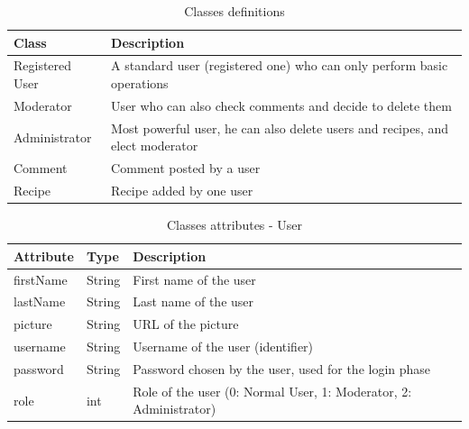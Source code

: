 \documentclass[a4paper]{report}
\begin{document}
\begin{table}[htpb]
\caption{Classes definitions}
\centering 
\begin{tabular}{|l|l|}
\hline
\rowcolor[HTML]{000000} 
{\color[HTML]{FFFFFF} Class} & {\color[HTML]{FFFFFF} Description}                                            \\ \hline
Registered User              & A standard user (registered one) who can only perform basic operations        \\ \hline
Moderator                    & User who can also check comments and decide to delete them                    \\ \hline
Administrator                & Most powerful user, he can also delete users and recipes, and elect moderator \\ \hline
Comment                      & Comment posted by a user                                                      \\ \hline
Recipe                       & Recipe added by one user                                                      \\ \hline
\end{tabular}
\end{table}

\begin{table}[htpb]
\caption{Classes attributes - User}
\centering 
\begin{tabular}{|l|l|l|}
\hline
\rowcolor[HTML]{000000} 
{\color[HTML]{FFFFFF} Attribute} & {\color[HTML]{FFFFFF} Type} & {\color[HTML]{FFFFFF} Description}                                \\ \hline
firstName                        & String                      & First name of the user                                            \\ \hline
lastName                         & String                      & Last name of the user                                             \\ \hline
picture                          & String                      & URL of the picture                                                \\ \hline
username                         & String                      & Username of the user (identifier)                                 \\ \hline
password                         & String                      & Password chosen by the user, used for the login phase             \\ \hline
role                             & int                         & Role of the user (0: Normal User, 1: Moderator, 2: Administrator) \\ \hline
\end{tabular}
\end{table}
\end{document}
